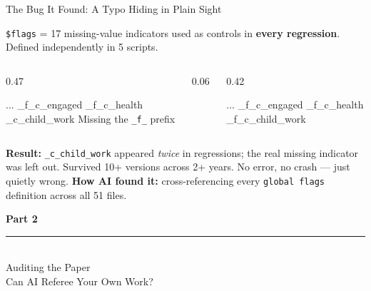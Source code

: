 \documentclass[aspectratio=169, 10pt]{beamer}
\begin{document}
\begin{frame}[fragile]{The Bug It Found: A Typo Hiding in Plain Sight}
\vskip-2pt
\begin{tcolorbox}[keybox, title={\faBug\quad The \texttt{\$flags} variable list}, top=2pt, bottom=2pt]
\small
\texttt{\$flags} = 17 missing-value indicators used as controls in \textbf{every regression}. Defined independently in 5 scripts.
\end{tcolorbox}
\vskip3pt
\begin{columns}[T]
\begin{column}{0.47\textwidth}
\begin{tcolorbox}[colback=SoftCoral!8, colframe=SoftCoral, boxrule=0.5pt, arc=2pt, left=5pt, right=5pt, top=3pt, bottom=3pt]
\vskip3pt
{\ttfamily\small\color{DeepCharcoal}
... \_f\_c\_engaged \_f\_c\_health\\
\colorbox{SoftCoral!20}{\_c\_child\_work}}
\vskip2pt
{\scriptsize Missing the \texttt{\_f\_} prefix}
\end{tcolorbox}
\end{column}
\begin{column}{0.06\textwidth}
\centering\vskip0.8cm
{\large\color{UVMGold}\faArrowRight}
\end{column}
\begin{column}{0.42\textwidth}
\begin{tcolorbox}[colback=PaleSage, colframe=SlateTeal!50, boxrule=0.5pt, arc=2pt, left=5pt, right=5pt, top=3pt, bottom=3pt]
\vskip3pt
{\ttfamily\small\color{DeepCharcoal}
... \_f\_c\_engaged \_f\_c\_health\\
\colorbox{PaleSage!50}{\_f\_c\_child\_work}}
\end{tcolorbox}
\end{column}
\end{columns}
\vskip3pt
\begin{tcolorbox}[quotebox, top=2pt, bottom=2pt]
\scriptsize \textbf{Result:} \texttt{\_c\_child\_work} appeared \textit{twice} in regressions; the real missing indicator was left out. Survived 10+ versions across 2+ years. No error, no crash --- just quietly wrong.
\textbf{How AI found it:} cross-referencing every \texttt{global flags} definition across all 51 files.
\end{tcolorbox}
\end{frame}

{
\begin{frame}
\centering\vfill
{\fontsize{22}{28}\bfseries\selectfont\color{white} Part 2}\\[6pt]
{\color{UVMGold}\rule{5cm}{0.8pt}}\\[6pt]
{\normalsize\color{UVMGold} Auditing the Paper}\\[4pt]
{\small\color{PaleSage} Can AI Referee Your Own Work?}
\vfill
\end{frame}
}
\end{document}
